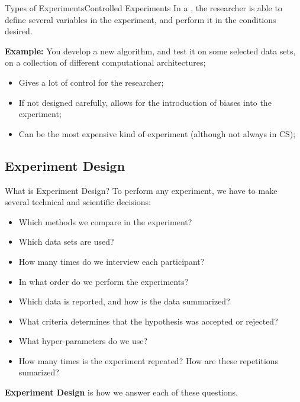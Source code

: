 \documentclass{beamer}
\begin{document}
\begin{CJK}{UTF8}{ipxm}
\begin{frame}{Types of Experiments}{Controlled Experiments}
  In a , the researcher is able to define several variables in the experiment, and perform it in the conditions desired.\bigskip

  {\bf Example:} You develop a new algorithm, and test it on some selected data sets, on a collection of different computational architectures;\bigskip

  \begin{itemize}
    \item Gives a lot of control for the researcher;
    \item If not designed carefully, allows for the introduction of biases into the experiment;
    \item Can be the most expensive kind of experiment (although not always in CS);
  \end{itemize}
\end{frame}


\subsection{Experiment Design}
\begin{frame}{What is Experiment Design?}
  To perform any experiment, we have to make several technical and scientific decisions:
  \begin{itemize}
    \item Which methods we compare in the experiment?
    \item Which data sets are used?
    \item How many times do we interview each participant?
    \item In what order do we perform the experiments?
    \item Which data is reported, and how is the data summarized?
    \item What criteria determines that the hypothesis was accepted or rejected?
    \item What hyper-parameters do we use?
    \item How many times is the experiment repeated? How are these repetitions sumarized?
  \end{itemize}
  {\bf Experiment Design} is how we answer each of these questions.
\end{frame}



\end{CJK}
\end{document}

